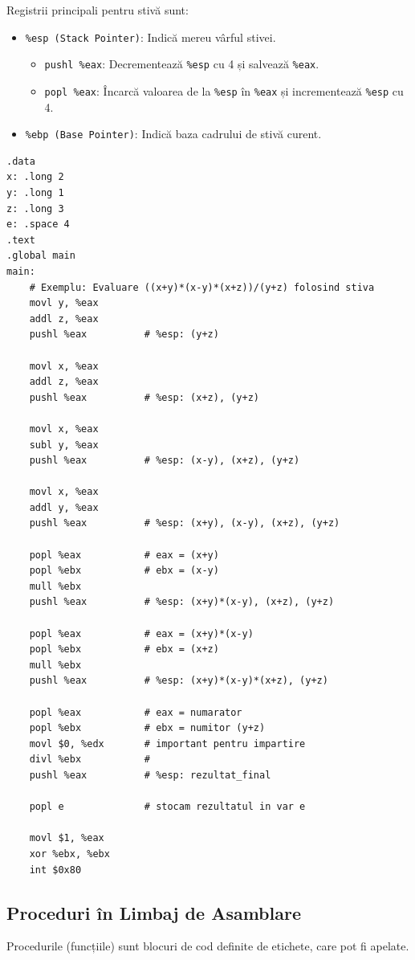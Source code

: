 \documentclass[12pt,a4paper]{article}
\begin{document}
Registrii principali pentru stivă sunt:
\begin{itemize}
    \item \texttt{\%esp (Stack Pointer)}: Indică mereu vârful stivei.
        \begin{itemize}
            \item \texttt{pushl \%eax}: Decrementează \texttt{\%esp} cu 4 și salvează \texttt{\%eax}.
            \item \texttt{popl \%eax}: Încarcă valoarea de la \texttt{\%esp} în \texttt{\%eax} și incrementează \texttt{\%esp} cu 4.
        \end{itemize}
    \item \texttt{\%ebp (Base Pointer)}: Indică baza cadrului de stivă curent.
\end{itemize}

\begin{lstlisting}[language=x86asm]
.data
x: .long 2
y: .long 1
z: .long 3
e: .space 4
.text
.global main
main:
    # Exemplu: Evaluare ((x+y)*(x-y)*(x+z))/(y+z) folosind stiva
    movl y, %eax
    addl z, %eax
    pushl %eax          # %esp: (y+z)
    
    movl x, %eax
    addl z, %eax        
    pushl %eax          # %esp: (x+z), (y+z)
    
    movl x, %eax
    subl y, %eax
    pushl %eax          # %esp: (x-y), (x+z), (y+z)
    
    movl x, %eax
    addl y, %eax
    pushl %eax          # %esp: (x+y), (x-y), (x+z), (y+z)

    popl %eax           # eax = (x+y)
    popl %ebx           # ebx = (x-y)
    mull %ebx           
    pushl %eax          # %esp: (x+y)*(x-y), (x+z), (y+z)

    popl %eax           # eax = (x+y)*(x-y)
    popl %ebx           # ebx = (x+z)
    mull %ebx
    pushl %eax          # %esp: (x+y)*(x-y)*(x+z), (y+z)

    popl %eax           # eax = numarator
    popl %ebx           # ebx = numitor (y+z)
    movl $0, %edx       # important pentru impartire
    divl %ebx           #
    pushl %eax          # %esp: rezultat_final
    
    popl e              # stocam rezultatul in var e

    movl $1, %eax
    xor %ebx, %ebx
    int $0x80
\end{lstlisting}

\subsection{Proceduri în Limbaj de Asamblare}
Procedurile (funcțiile) sunt blocuri de cod definite de etichete, care pot fi apelate.
\end{document}
